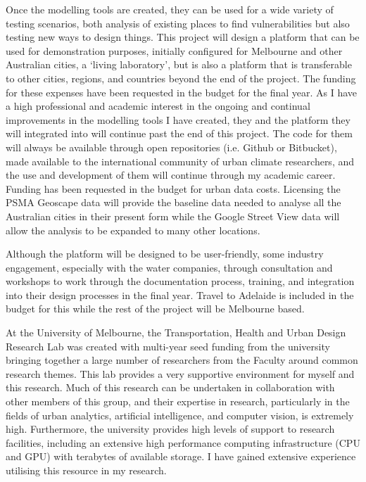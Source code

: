 Once the modelling tools are created, they can be used for a wide variety of testing scenarios, both analysis of existing places to find vulnerabilities but also testing new ways to design things. This project will design a platform that can be used for demonstration purposes, initially configured for Melbourne and other Australian cities, a `living laboratory', but is also a platform that is transferable to other cities, regions, and countries beyond the end of the project. The funding for these expenses have been requested in the budget for the final year. As I have a high professional and academic interest in the ongoing and continual improvements in the modelling tools I have created, they and the platform they will integrated into will continue past the end of this project. The code for them will always be available through open repositories (i.e. Github or Bitbucket), made available to the international community of urban climate researchers, and the use and development of them will continue through my academic career. Funding has been requested in the budget for urban data costs. Licensing the PSMA Geoscape data will provide the baseline data needed to analyse all the Australian cities in their present form while the Google Street View data will allow the analysis to be expanded to many other locations.

Although the platform will be designed to be user-friendly, some industry engagement, especially with the water companies, through consultation and workshops to work through the documentation process, training, and integration into their design processes in the final year. Travel to Adelaide is included in the budget for this while the rest of the project will be Melbourne based.

At the University of Melbourne, the Transportation, Health and Urban Design Research Lab was created with multi-year seed funding from the university bringing together a large number of researchers from the Faculty around common research themes. This lab provides a very supportive environment for myself and this research. Much of this research can be undertaken in collaboration with other members of this group, and their expertise in research, particularly in the fields of urban analytics, artificial intelligence, and computer vision, is extremely high. Furthermore, the university provides high levels of support to research facilities, including an extensive high performance computing infrastructure (CPU and GPU) with terabytes of available storage. I have gained extensive experience utilising this resource in my research. 

